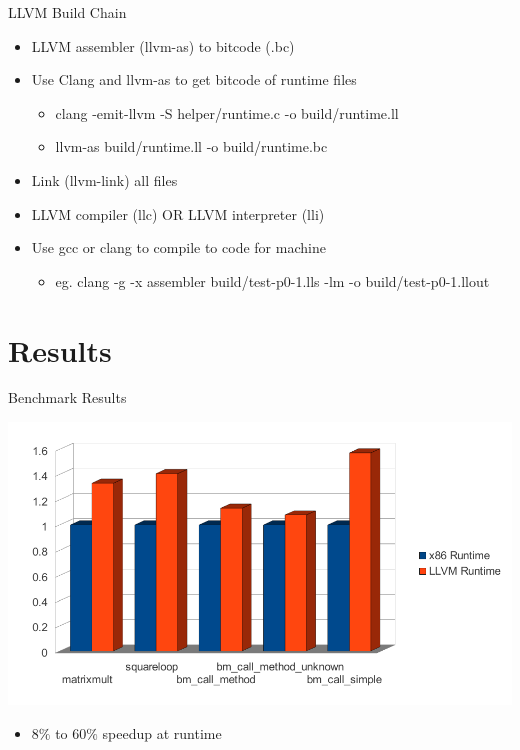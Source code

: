 \documentclass{beamer}
\begin{document}
\begin{frame}{LLVM Build Chain}
  \begin{itemize}
  \item<1->LLVM assembler (llvm-as) to bitcode (.bc)
  \item<2->Use Clang and llvm-as to get bitcode of runtime files
    \begin{itemize}
    \item<2->clang -emit-llvm -S helper/runtime.c -o build/runtime.ll
    \item<2->llvm-as  build/runtime.ll -o build/runtime.bc
    \end{itemize}
  \item<3->Link (llvm-link) all files
  \item<4->LLVM compiler (llc) OR LLVM interpreter (lli)
  \item<5->Use gcc or clang to compile to code for machine 
    \begin{itemize}
    \item<5->eg. clang -g -x assembler build/test-p0-1.lls -lm -o build/test-p0-1.llout
    \end{itemize}
  \end{itemize}
\end{frame}

\section{Results}

\begin{frame}{Benchmark Results}
  \begin{center}
    \includegraphics[scale=.63]{./include/pdf/runtime.pdf}
  \end{center}
  \begin{itemize}
  \item $8\%$ to $60\%$ speedup at runtime
  \end{itemize}
\end{frame}
\end{document}
